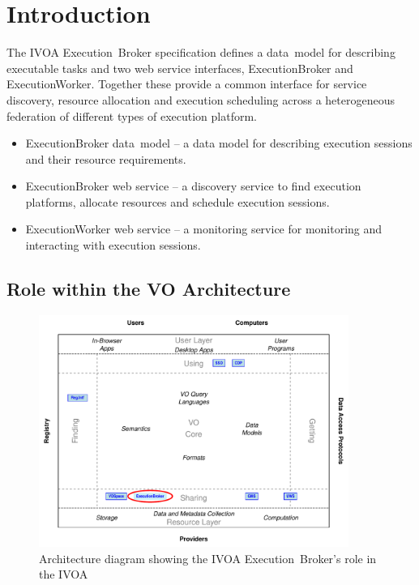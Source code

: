 \documentclass[11pt,a4paper]{ivoa}
\newcommand{\datamodel} {data~model}
\newcommand{\webservice} {web service}
\newcommand{\ivoa} {IVOA}
\newcommand{\execbrokerclass} {ExecutionBroker}
\newcommand{\execworkerclass} {ExecutionWorker}
\newcommand{\executionbroker} {Execution~Broker}
\begin{document}
\section{Introduction}
\label{introduction}

The \ivoa{} \executionbroker{} specification defines a \datamodel{} for describing executable tasks
and two \webservice{} interfaces, \execbrokerclass{} and \execworkerclass{}.
Together these provide a common interface for service discovery, resource allocation
and execution scheduling across a heterogeneous federation of different types of
execution platform.

\begin{itemize}
    \item \execbrokerclass{} \datamodel{}  – a data model for describing execution sessions and their resource requirements.
    \item \execbrokerclass{} \webservice{} – a discovery service to find execution platforms, allocate resources and schedule execution sessions.
    \item \execworkerclass{} \webservice{} – a monitoring service for monitoring and interacting with execution sessions.
\end{itemize}

\subsection{Role within the VO Architecture}
\label{subsec:ivoarole}

\begin{figure}
\centering
\includegraphics[width=0.9\textwidth]{role_diagram.pdf}
\caption{Architecture diagram showing the \ivoa{} \executionbroker{}'s role in the \ivoa}
\label{fig:archdiag}
\end{figure}
\end{document}
